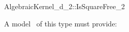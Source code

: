 \begin{ccRefConcept}{AlgebraicKernel_d_2::IsSquareFree_2}


A model \ccVar\ of this type must provide:

{}

\ccSeeAlso

\end{ccRefConcept}
